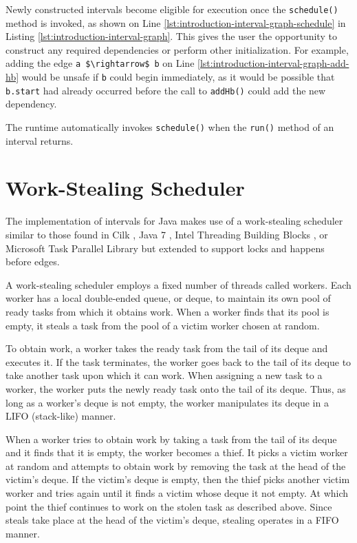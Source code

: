Newly constructed intervals become eligible for execution once the
\lstinline!schedule()! method is invoked, as shown on Line
\ref{lst:introduction-interval-graph-schedule} in Listing
\ref{lst:introduction-interval-graph}. This gives the user the
opportunity to construct any required dependencies or perform other
initialization. For example, adding the edge
\lstinline!a $\rightarrow$ b! on Line
\ref{lst:introduction-interval-graph-add-hb} would be unsafe if
\lstinline!b! could begin immediately, as it would be possible that
\lstinline!b.start! had already occurred before the call to
\lstinline!addHb()! could add the new dependency.

The runtime automatically invokes \lstinline!schedule()! when the
\lstinline!run()! method of an interval returns.


\section{Work-Stealing Scheduler}
\label{sec:intro-work-stealing-scheduler}

The implementation of intervals for Java makes use of a work-stealing
scheduler similar to those found in Cilk \cite{Blumofe1995,
  Frigo1998}, Java 7 \cite{Lea2000, Lea2000a, Lea2004, Lea2006}, Intel
Threading Building Blocks \cite{Reinders2007, Contreras2008}, or
Microsoft Task Parallel Library \cite{Leijen2009} but extended to
support locks and happens before edges.

A work-stealing scheduler employs a fixed number of threads called
workers. Each worker has a local double-ended queue, or deque, to
maintain its own pool of ready tasks from which it obtains work. When
a worker finds that its pool is empty, it steals a task from the pool
of a victim worker chosen at random.

To obtain work, a worker takes the ready task from the tail of its
deque and executes it. If the task terminates, the worker goes back to
the tail of its deque to take another task upon which it can
work. When assigning a new task to a worker, the worker puts the newly
ready task onto the tail of its deque. Thus, as long as a worker's
deque is not empty, the worker manipulates its deque in a LIFO
(stack-like) manner.

When a worker tries to obtain work by taking a task from the tail of
its deque and it finds that it is empty, the worker becomes a
thief. It picks a victim worker at random and attempts to obtain work
by removing the task at the head of the victim's deque. If the
victim's deque is empty, then the thief picks another victim worker
and tries again until it finds a victim whose deque it not empty. At
which point the thief continues to work on the stolen task as
described above. Since steals take place at the head of the victim's
deque, stealing operates in a FIFO manner.

